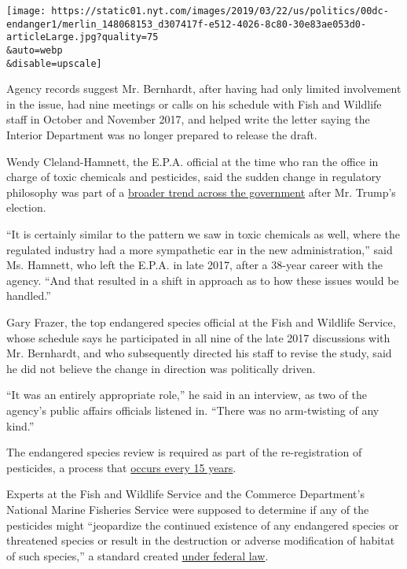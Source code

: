 \texttt{[image: https://static01.nyt.com/images/2019/03/22/us/politics/00dc-endanger1/merlin\_148068153\_d307417f-e512-4026-8c80-30e83ae053d0-articleLarge.jpg?quality=75\\\&auto=webp\\\&disable=upscale]}

Agency records suggest Mr. Bernhardt, after having had only limited
involvement in the issue, had nine meetings or calls on his schedule
with Fish and Wildlife staff in October and November 2017, and helped
write the letter saying the Interior Department was no longer prepared
to release the draft.

Wendy Cleland-Hamnett, the E.P.A. official at the time who ran the
office in charge of toxic chemicals and pesticides, said the sudden
change in regulatory philosophy was part of a
\href{https://www.nytimes.com/2017/10/21/us/trump-epa-chemicals-regulations.html}{broader
trend across the government} after Mr. Trump's election.

``It is certainly similar to the pattern we saw in toxic chemicals as
well, where the regulated industry had a more sympathetic ear in the new
administration,'' said Ms. Hamnett, who left the E.P.A. in late 2017,
after a 38-year career with the agency. ``And that resulted in a shift
in approach as to how these issues would be handled.''

Gary Frazer, the top endangered species official at the Fish and
Wildlife Service, whose schedule says he participated in all nine of the
late 2017 discussions with Mr. Bernhardt, and who subsequently directed
his staff to revise the study, said he did not believe the change in
direction was politically driven.

``It was an entirely appropriate role,'' he said in an interview, as two
of the agency's public affairs officials listened in. ``There was no
arm-twisting of any kind.''

The endangered species review is required as part of the re-registration
of pesticides, a process that
\href{https://www.epa.gov/pesticide-reevaluation/registration-review-process}{occurs
every 15 years}.

Experts at the Fish and Wildlife Service and the Commerce Department's
National Marine Fisheries Service were supposed to determine if any of
the pesticides might ``jeopardize the continued existence of any
endangered species or threatened species or result in the destruction or
adverse modification of habitat of such species,'' a standard created
\href{https://www.fws.gov/endangered/laws-policies/section-7.html}{under
federal law}.


